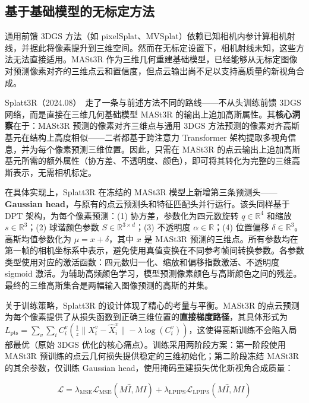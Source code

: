 \subsection{基于基础模型的无标定方法}

通用前馈 3DGS 方法（如 pixelSplat、MVSplat）依赖已知相机内参计算相机射线，并据此将像素提升到三维空间。然而在无标定设置下，相机射线未知，这些方法无法直接适用。MASt3R 作为三维几何重建基础模型，已经能够从无标定图像对预测像素对齐的三维点云和置信度，但点云输出尚不足以支持高质量的新视角合成。

Splatt3R（2024.08）~\cite{2408_13912}走了一条与前述方法不同的路线——不从头训练前馈 3DGS 网络，而是直接在三维几何基础模型 MASt3R 的输出上追加高斯属性。其\textbf{核心洞察}在于：MASt3R 预测的像素对齐三维点与通用 3DGS 方法预测的像素对齐高斯基元在结构上高度相似——二者都基于跨注意力 Transformer 架构提取多视角信息，并为每个像素预测三维位置。因此，只需在 MASt3R 的点云输出上追加高斯基元所需的额外属性（协方差、不透明度、颜色），即可将其转化为完整的三维高斯表示，无需相机标定。

在具体实现上，Splatt3R 在冻结的 MASt3R 模型上新增第三条预测头——\textbf{Gaussian head}，与原有的点云预测头和特征匹配头并行运行。该头同样基于 DPT 架构，为每个像素预测：(1) 协方差，参数化为四元数旋转 $q \in \mathbb{R}^4$ 和缩放 $s \in \mathbb{R}^3$；(2) 球谐颜色参数 $S \in \mathbb{R}^{3 \times d}$；(3) 不透明度 $\alpha \in \mathbb{R}$；(4) 位置偏移 $\delta \in \mathbb{R}^3$。高斯均值参数化为 $\mu = x + \delta$，其中 $x$ 是 MASt3R 预测的三维点。所有参数均在第一帧的相机坐标系中表示，避免使用真值变换在不同参考帧间转换参数。各参数类型使用对应的激活函数：四元数归一化、缩放和偏移指数激活、不透明度 sigmoid 激活。为辅助高频颜色学习，模型预测像素颜色与高斯颜色之间的残差。最终的三维高斯集合是两幅输入图像预测的高斯的并集。

关于训练策略，Splatt3R 的设计体现了精心的考量与平衡。MASt3R 的点云预测为每个像素提供了从损失函数到正确三维位置的\textbf{直接梯度路径}，其具体形式为$L_\text{pts} = \sum_{v} \sum_i C_i^v \left(\frac{1}{z}\|X_i^v - \hat{X}_i^v\| - \lambda \log(C_i^v)\right)$，这使得高斯训练不会陷入局部最优（原始 3DGS 优化的核心痛点）。训练采用两阶段方案：第一阶段使用 MASt3R 预训练的点云几何损失提供稳定的三维初始化；第二阶段冻结 MASt3R 的其余参数，仅训练 Gaussian head，使用掩码重建损失优化新视角合成质量：

\begin{equation}
\mathcal{L} = \lambda_\text{MSE} \mathcal{L}_\text{MSE}(M \hat{I}, MI) + \lambda_\text{LPIPS} \mathcal{L}_\text{LPIPS}(M \hat{I}, MI)
\end{equation}

